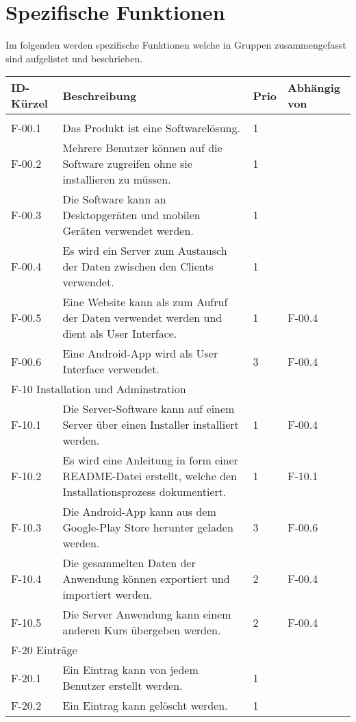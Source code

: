 \newpage
\section{Spezifische Funktionen}
Im folgenden werden spezifische Funktionen welche in Gruppen zusammengefasst sind aufgelistet und beschrieben.
\begin{tabularx}{\textwidth}{|l|X|l|l|}
    \toprule
    \textbf{ID-Kürzel} & \textbf{Beschreibung} & \textbf{Prio} & \textbf{Abhängig von} \\
    \midrule
    \endhead
    \hline
    \caption{Functionen}
    \endfoot
    \multicolumn{4}{|l|}{F-00 Allgemein}\\
    \hline
    F-00.1 & Das Produkt ist eine Softwarelösung. & 1 & \\
    F-00.2 & Mehrere Benutzer können auf die Software zugreifen ohne sie installieren zu müssen. & 1 & \\
    F-00.3 & Die Software kann an Desktopgeräten und mobilen Geräten verwendet werden. & 1 & \\
    F-00.4 & Es wird ein Server zum Austausch der Daten zwischen den Clients verwendet. & 1 & \\
    F-00.5 & Eine Website kann als zum Aufruf der Daten verwendet werden und dient als User Interface. & 1 & F-00.4\\
    F-00.6 & Eine Android-App wird als User Interface verwendet. & 3 & F-00.4\\
    \hline
    \multicolumn{4}{|l|}{F-10 Installation und Adminstration}\\
    \hline
    F-10.1 & Die Server-Software kann auf einem Server über einen Installer installiert werden. & 1 & F-00.4 \\
    F-10.2 & Es wird eine Anleitung in form einer README-Datei erstellt, welche den Installationsprozess dokumentiert. & 1 & F-10.1\\
    F-10.3 & Die Android-App kann aus dem Google-Play Store herunter geladen werden. & 3 & F-00.6\\
    F-10.4 & Die gesammelten Daten der Anwendung können exportiert und importiert werden. & 2 & F-00.4\\
    F-10.5 & Die Server Anwendung kann einem anderen Kurs übergeben werden. & 2 & F-00.4\\
    \hline
    \multicolumn{4}{|l|}{F-20 Einträge}\\
    \hline
    F-20.1 & Ein Eintrag kann von jedem Benutzer erstellt werden. & 1 & \\
    F-20.2 & Ein Eintrag kann gelöscht werden. & 1 & \\

\end{tabularx}
